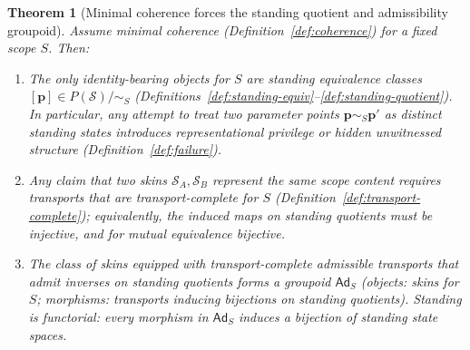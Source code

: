 \documentclass[11pt]{article}
\newtheorem{theorem}[definition]{Theorem}
\theoremstyle{remark}
\newcommand{\Skin}{\mathcal{S}}
\newcommand{\Ad}{\ensuremath{\mathsf{Ad}}}
\begin{document}
\begin{theorem}[Minimal coherence forces the standing quotient and admissibility groupoid]\label{thm:coherence-groupoid}
Assume minimal coherence (Definition~\ref{def:coherence}) for a fixed scope $S$.
Then:
\begin{enumerate}[label=(\roman*),leftmargin=2.2em]
\item The only identity-bearing objects for $S$ are standing equivalence classes $[\mathbf{p}]\in P(\Skin)/\!\sim_S$
(Definitions~\ref{def:standing-equiv}--\ref{def:standing-quotient}). In particular, any attempt to treat two
parameter points $\mathbf{p}\sim_S\mathbf{p}'$ as distinct standing states introduces representational
privilege or hidden unwitnessed structure (Definition~\ref{def:failure}).
\item Any claim that two skins $\Skin_A,\Skin_B$ represent the \emph{same} scope content requires transports that
are transport-complete for $S$ (Definition~\ref{def:transport-complete}); equivalently, the induced maps on
standing quotients must be injective, and for mutual equivalence bijective.
\item The class of skins equipped with transport-complete admissible transports that admit inverses on standing
quotients forms a \emph{groupoid} $\Ad_S$ (objects: skins for $S$; morphisms: transports inducing bijections on
standing quotients). Standing is functorial: every morphism in $\Ad_S$ induces a bijection of standing state
spaces.
\end{enumerate}
\end{theorem}
\end{document}
